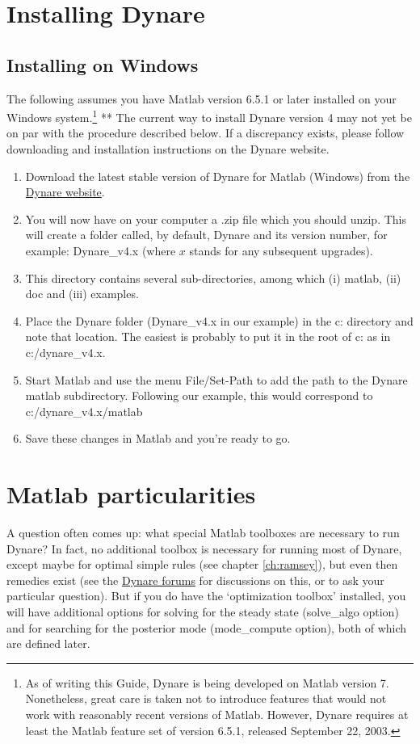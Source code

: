 \section{Installing Dynare}
\subsection{Installing on Windows}
The following assumes you have Matlab version 6.5.1 or later installed on your Windows system.\footnote{As of writing this Guide, Dynare is being developed on Matlab version 7. Nonetheless, great care is taken not to introduce features that would not work with reasonably recent versions of Matlab. However, Dynare requires at least the Matlab feature set of version 6.5.1, released September 22, 2003.} ** The current way to install Dynare version 4 may not yet be on par with the procedure described below. If a discrepancy exists, please follow downloading and installation instructions on the Dynare website. \begin{enumerate}
\item Download the latest stable version of Dynare for Matlab (Windows) from the \href{http://www.dynare.org}{Dynare website}. 
\item You will now have on your computer a .zip file which you should unzip. This will create a folder called, by default, Dynare and its version number, for example: Dynare\_v4.x (where $x$ stands for any subsequent upgrades). 
\item This directory contains several sub-directories, among which (i) matlab, (ii) doc and (iii) examples. 
\item Place the Dynare folder (Dynare\_v4.x in our example) in the c: directory and note that location. The easiest is probably to put it in the root of c: as in c:/dynare\_v4.x.
\item Start Matlab and use the menu File/Set-Path to add the path to the Dynare 
matlab subdirectory. Following our example, this would correspond to 
c:/dynare\_v4.x/matlab
\item Save these changes in Matlab and you're ready to go.
\end{enumerate} 


\section{Matlab particularities}

A question often comes up: what special Matlab toolboxes are necessary to run Dynare? In fact, no additional toolbox is necessary for running most of Dynare, except maybe for optimal simple rules (see chapter \ref{ch:ramsey}), but even then remedies exist (see the \href{http://www.dynare.org/phpBB3}{Dynare forums} for discussions on this, or to ask your particular question). But if you do have the `optimization toolbox' installed, you will have additional options for solving for the steady state (solve\_algo option) and for searching for the posterior mode (mode\_compute option), both of which are defined later. 


